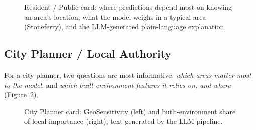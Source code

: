 \begin{figure}[H]
\def\cardcontent{\begin{tcolorbox}[stakecard]
\setlength{\parskip}{0pt}\raggedright%
{\color{cardMuted}What the model pays attention to, across Hull and in a typical area}\par\vspace{4pt}
\cardpair{01 \textperiodcentered{} Across Hull}{Chapter6/figs/dashboard_public_short_E01012806_1.png}
  {02 \textperiodcentered{} A typical area: Stoneferry}{Chapter6/figs/dashboard_public_short_E01012806_2.png}
  {}{\cardSecA}
  {}{\cardSecB}
\vspace{5pt}
\cardtiles
\cardfoot{\cardFooter{} Panels are the dashboard's public view.}
\end{tcolorbox}}
\caption{Resident / Public card: where predictions depend most on knowing an area's location, what the
model weighs in a typical area (Stoneferry), and the LLM-generated plain-language explanation.}
\label{fig:stakeholder-public}
\end{figure}


\clearpage

\subsection{City Planner / Local Authority}
For a city planner, two questions are most informative: \emph{which areas matter most to the
model}, and \emph{which built-environment features it relies on, and where}
(Figure~\ref{fig:stakeholder-planner}).\par\medskip
\def\cardtilegroup{plannertiles}
\measurecard

\begin{figure}[H]
\def\cardcontent{\begin{tcolorbox}[stakecard]
\setlength{\parskip}{0pt}\raggedright%
{\color{cardMuted}Important areas and built-environment reliance}\par\vspace{4pt}
\cardpair{01 \textperiodcentered{} Most important areas}{Chapter6/figs/dashboard_planner_short_E01033104_1.png}
  {02 \textperiodcentered{} Built-environment share}{Chapter6/figs/dashboard_planner_short_E01033104_2.png}
  {}{\cardSecA}
  {}{\cardSecB}
\vspace{5pt}
\cardtiles
\cardfoot{\cardFooter{} Map 01: signed GeoSensitivity (sign is not a crime direction). Map 02:
share of local importance, not an effect on crime.}
\end{tcolorbox}}
\caption{City Planner card: GeoSensitivity (left) and built-environment share of local importance
(right); text generated by the LLM pipeline.}
\label{fig:stakeholder-planner}
\end{figure}


